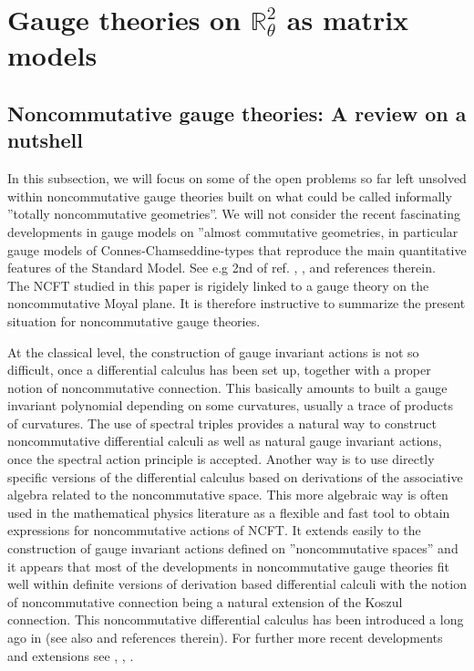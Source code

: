 \documentclass[a4paper,11pt,twoside]{article}
\numberwithin{equation}{section}
\theoremstyle{nonumberplain}
\newcounter{and}
\begin{document}
\section{\texorpdfstring{Gauge theories on $\mathbb{R}^2_\theta$ as matrix models}{Moyal 2-d}}\label{subsection22}
\subsection{Noncommutative gauge theories: A review on a nutshell}\label{section-review}

In this subsection, we will focus on some of the open problems so far left unsolved within noncommutative gauge theories built on what could be called informally  ''totally noncommutative geometries''. We will not consider the recent fascinating developments in gauge models on ''almost commutative geometries, in particular gauge models of Connes-Chamseddine-types that reproduce the main quantitative features of the Standard Model. See e.g 2nd of ref. \cite{Connes1}, \cite{ccs1}, \cite{ccs2}and references therein. \\
The NCFT studied in this paper is rigidely linked to a gauge theory on the noncommutative Moyal plane. It is therefore instructive to summarize the present situation for noncommutative gauge theories.\par
At the classical level, the construction of gauge invariant actions is not so difficult, once a differential calculus has been set up, together with a proper notion of noncommutative connection. This basically amounts to built a gauge invariant polynomial depending on some curvatures, usually a trace of products of curvatures. The use of spectral triples provides a natural way to construct noncommutative differential calculi as well as natural gauge invariant actions, once the spectral action principle is accepted. Another way is to use directly specific versions of the differential calculus based on derivations of the associative algebra related to the noncommutative space. This more algebraic way is often used in the mathematical physics literature as a flexible and fast tool to obtain expressions for noncommutative actions of NCFT. It extends easily to the construction of gauge invariant actions defined on ''noncommutative spaces'' and it appears that most of the developments in noncommutative gauge 
theories fit well within definite versions of derivation based differential calculi with the notion of noncommutative connection being a natural extension of the Koszul connection. This noncommutative differential calculus has been introduced a long ago in \cite{mdv88} (see also \cite{mdv99} and references therein). For further more recent developments and extensions see \cite{WAL1}, \cite{WAL2}, \cite{WAL3}.\par
\end{document}
